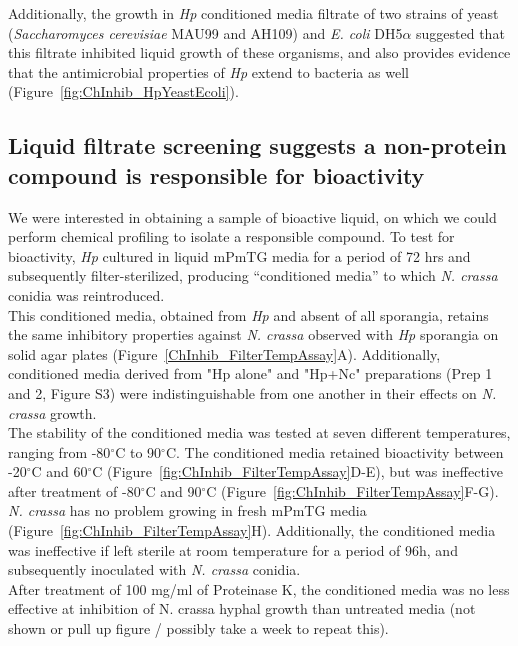 \indent Additionally, the growth in \textit{Hp} conditioned media filtrate of two strains of yeast (\textit{Saccharomyces cerevisiae} MAU99 and AH109) and \textit{E. coli} DH5$\alpha$ suggested that this filtrate inhibited liquid growth of these organisms, and also provides evidence that the antimicrobial properties of \textit{Hp} extend to bacteria as well (Figure~\ref{fig:ChInhib_HpYeastEcoli}).\\
\subsection{Liquid filtrate screening suggests a non-protein compound is responsible for bioactivity}
We were interested in obtaining a sample of bioactive liquid, on which we could perform chemical profiling to isolate a responsible compound. To test for bioactivity, \textit{Hp} cultured in liquid mPmTG media for a period of 72 hrs and subsequently filter-sterilized, producing “conditioned media” to which \textit{N. crassa} conidia was reintroduced. \\
\indent This conditioned media, obtained from \textit{Hp} and absent of all sporangia, retains the same inhibitory properties against \textit{N. crassa} observed with \textit{Hp} sporangia on solid agar plates (Figure~\ref{ChInhib_FilterTempAssay}A). Additionally, conditioned media derived from "Hp alone" and "Hp+Nc" preparations (Prep 1 and 2, Figure S3) were indistinguishable from one another in their effects on \textit{N. crassa} growth. \\
\indent The stability of the conditioned media was tested at seven different temperatures, ranging from -80$^{\circ}$C to 90$^{\circ}$C. The conditioned media retained bioactivity between -20$^{\circ}$C and 60$^{\circ}$C (Figure~\ref{fig:ChInhib_FilterTempAssay}D-E), but was ineffective after treatment of -80$^{\circ}$C and 90$^{\circ}$C (Figure~\ref{fig:ChInhib_FilterTempAssay}F-G). \textit{N. crassa} has no problem growing in fresh mPmTG media (Figure~\ref{fig:ChInhib_FilterTempAssay}H). Additionally, the conditioned media was ineffective if left sterile at room temperature for a period of 96h, and subsequently inoculated with \textit{N. crassa} conidia.\\
\indent After treatment of 100 mg/ml of Proteinase K, the conditioned media was no less effective at inhibition of N. crassa hyphal growth than untreated media (not shown or pull up figure / possibly take a week to repeat this).\\

